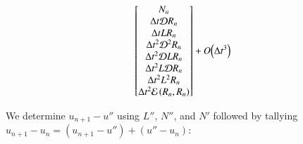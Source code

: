 \documentclass[letterpaper,11pt]{amsart}
\newcommand{\order}[2]{\ensuremath{O\!\left( {#1}^{#2} \right)}}
\begin{document}
\begin{subequations}
\begin{align}
\begin{bmatrix}
  N_{n} \\
  \Delta{}t \mathcal{D} R_{n} \\
  \Delta{}t L R_{n} \\
  \Delta{}t^{2} \mathcal{D}^{2} R_{n} \\
  \Delta{}t^{2} \mathcal{D} L R_{n} \\
  \Delta{}t^{2} L \mathcal{D} R_{n} \\
  \Delta{}t^{2} L^{2} R_{n} \\
  \Delta{}t^{2} \mathcal{E}\left( R_{n}, R_{n} \right)
\end{bmatrix}
  + \order{\Delta{}t}{3}
\notag
\end{align}
\end{subequations}

We determine $u_{n+1}-u''$ using $L''$, $N''$, and $N'$ followed by tallying
$u_{n+1}-u_{n} = (u_{n+1}-u'')+(u''-u_{n})$:
\end{document}
